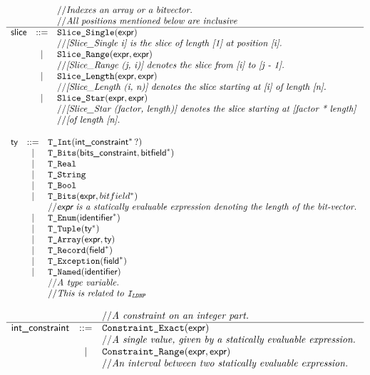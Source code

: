 \documentclass{book}
\begin{document}
\[
\begin{array}{rcl}
&&// \textit{Indexes an array or a bitvector.}\ \\
&&// \textit{All positions mentioned below are inclusive}\ \\
\hline
\textsf{slice} &::=& \texttt{Slice\_Single} (\textsf{expr}) \\
  & & // \textit{[Slice\_Single i] is the slice of length [1] at position [i].}\ \\
  &|& \texttt{Slice\_Range}(\textsf{expr}, \textsf{expr}) \\
  & & // \textit{[Slice\_Range (j, i)] denotes the slice from [i] to [j - 1].}\ \\
  &|& \texttt{Slice\_Length}(\textsf{expr}, \textsf{expr}) \\
  & & // \textit{[Slice\_Length (i, n)] denotes the slice starting at [i] of length
          [n].}\ \\
  &|& \texttt{Slice\_Star}(\textsf{expr}, \textsf{expr}) \\
  & & // \textit{[Slice\_Star (factor, length)] denotes the slice starting at [factor
          * length]}\ \\
  & & // \textit{[of length [n].}\ \\
\end{array}
\]

\[
\begin{array}{rcl}
\ty &::=& \TInt(\intconstraint^*\,?) \\
  &|& \TBits(\bitsconstraint, \bitfield^{*}) \\
  &|& \TReal \\
  &|& \TString \\
  &|& \TBool \\
  &|& \TBits(\expr, bitfield^{*}) \\
  & & \ASTComment{\expr\ is a statically evaluable expression denoting the length of the bit-vector.}\\
  &|& \TEnum(\identifier^{*}) \\
  &|& \TTuple(\ty^{*}) \\
  &|& \TArray(\expr, \ty) \\
  &|& \TRecord(\Field^{*}) \\
  &|& \TException(\Field^{*}) \\
  &|& \TNamed(\identifier)\\
  & & \ASTComment{A type variable.}\\
  & & \ASTComment{This is related to \identi{LDNP}}
\end{array}
\]

\[
\begin{array}{rcl}
& & // \textit{A constraint on an integer part.}\ \\
\hline
\textsf{int\_constraint} &::=& \texttt{Constraint\_Exact}(\textsf{expr}) \\
  & & // \textit{A single value, given by a statically evaluable expression.}\ \\
  &|& \texttt{Constraint\_Range}(\textsf{expr}, \textsf{expr}) \\
  & & // \textit{An interval between two statically evaluable expression.}\ \\
\end{array}
\]
\end{document}
